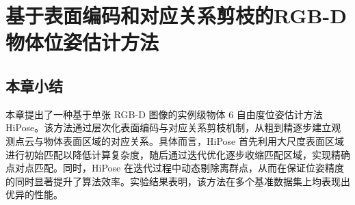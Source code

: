 \chapter{基于表面编码和对应关系剪枝的RGB-D物体位姿估计方法}

\section{本章小结}
\par 本章提出了一种基于单张 RGB-D 图像的实例级物体 6 自由度位姿估计方法 HiPose。该方法通过层次化表面编码与对应关系剪枝机制，从粗到精逐步建立观测点云与物体表面区域的对应关系。具体而言，HiPose 首先利用大尺度表面区域进行初始匹配以降低计算复杂度，随后通过迭代优化逐步收缩匹配区域，实现精确点对点匹配。同时，HiPose 在迭代过程中动态剔除离群点，从而在保证位姿精度的同时显著提升了算法效率。实验结果表明，该方法在多个基准数据集上均表现出优异的性能。